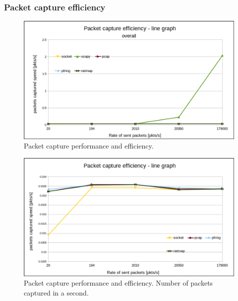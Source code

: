 \documentclass[12pt,a4paper,twoside]{book}
\begin{document}
            \subsubsection*{Packet capture efficiency} \label{analysis:testing:results:capture}
                \begin{figure}[h]
                    \centering
                    \includegraphics[scale=0.5]{overall_drops_line-graph}
                    \caption{Packet capture performance and efficiency.}
                    \label{figure:tests:alldrops}
                \end{figure}
                \begin{figure}[h]
                    \centering
                    \includegraphics[scale=0.5]{closeup_drops_line-graph}
                    \caption{Packet capture performance and efficiency. Number of packets captured in a second.}
                    \label{figure:tests:closedrops}
                \end{figure}                
                
\end{document}
